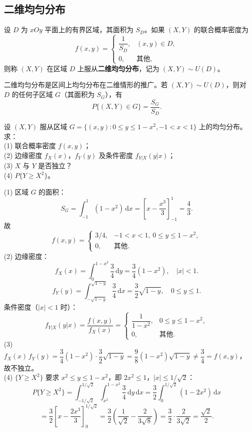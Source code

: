 ﻿\documentclass[lang=cn,11pt]{elegantbook}
\begin{document}
\subsection{二维均匀分布}

\begin{definition}[二维均匀分布] \label{def:2d-uniform}
设 $D$ 为 $xOy$ 平面上的有界区域，其面积为 $S_D$。如果 $(X,Y)$ 的联合概率密度为
\[
f(x,y) = \begin{cases} \dfrac{1}{S_D}, & (x,y) \in D, \\ 0, & \text{其他}, \end{cases}
\]
则称 $(X,Y)$ 在区域 $D$ 上服从\textbf{二维均匀分布}，记为 $(X,Y) \sim U(D)$。
\end{definition}

二维均匀分布是区间上均匀分布在二维情形的推广。若 $(X,Y) \sim U(D)$，则对 $D$ 的任何子区域 $G$（其面积为 $S_G$），有
\[
P\{(X,Y) \in G\} = \frac{S_G}{S_D}.
\]


\begin{exercise}[抛物线区域上的均匀分布] \label{exer:3-c7b}
设 $(X,Y)$ 服从区域 $G=\{(x,y): 0 \leqslant y \leqslant 1-x^2,-1<x<1\}$ 上的均匀分布。求：\\
(1) 联合概率密度 $f(x,y)$；\\
(2) 边缘密度 $f_X(x)$，$f_Y(y)$ 及条件密度 $f_{Y|X}(y|x)$；\\
(3) $X$ 与 $Y$ 是否独立？\\
(4) $P\{Y \geqslant X^2\}$。
\end{exercise}
\begin{solution}
(1) 区域 $G$ 的面积：
\[
S_G = \int_{-1}^1(1-x^2)\,\mathrm{d}x = \left[x-\frac{x^3}{3}\right]_{-1}^1 = \frac{4}{3}.
\]
故
\[
f(x,y) = \begin{cases} 3/4, & -1 < x < 1,\ 0 \leqslant y \leqslant 1-x^2, \\ 0, & \text{其他}. \end{cases}
\]
(2) 边缘密度：
\[
f_X(x) = \int_0^{1-x^2}\frac{3}{4}\,\mathrm{d}y = \frac{3}{4}(1-x^2),\quad |x|<1.
\]
\[
f_Y(y) = \int_{-\sqrt{1-y}}^{\sqrt{1-y}}\frac{3}{4}\,\mathrm{d}x = \frac{3}{2}\sqrt{1-y},\quad 0 \leqslant y \leqslant 1.
\]
条件密度（$|x|<1$ 时）：
\[
f_{Y|X}(y|x) = \frac{f(x,y)}{f_X(x)} = \begin{cases} \dfrac{1}{1-x^2}, & 0 \leqslant y \leqslant 1-x^2, \\ 0, & \text{其他}. \end{cases}
\]
(3) $f_X(x)\,f_Y(y) = \dfrac{3}{4}(1-x^2)\cdot\dfrac{3}{2}\sqrt{1-y} = \dfrac{9}{8}(1-x^2)\sqrt{1-y} \neq \dfrac{3}{4} = f(x,y)$，故不独立。\\
(4) $\{Y \geqslant X^2\}$ 要求 $x^2 \leqslant y \leqslant 1-x^2$，即 $2x^2 \leqslant 1$，$|x| \leqslant 1/\sqrt{2}$：
\[
P\{Y \geqslant X^2\} = \int_{-1/\sqrt{2}}^{1/\sqrt{2}}\int_{x^2}^{1-x^2}\frac{3}{4}\,\mathrm{d}y\,\mathrm{d}x = \frac{3}{2}\int_0^{1/\sqrt{2}}(1-2x^2)\,\mathrm{d}x
\]
\[
= \frac{3}{2}\left[x-\frac{2x^3}{3}\right]_0^{1/\sqrt{2}} = \frac{3}{2}\left(\frac{1}{\sqrt{2}}-\frac{2}{3\sqrt{8}}\right) = \frac{3}{2}\cdot\frac{2}{3\sqrt{2}} = \frac{\sqrt{2}}{2}.
\]
\end{solution}
\end{document}
